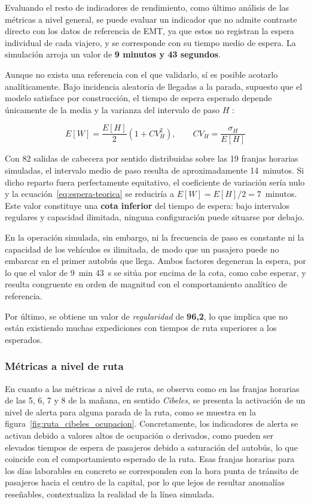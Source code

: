 Evaluando el resto de indicadores de rendimiento, como último análisis de las métricas a nivel general,
se puede evaluar un indicador
que no admite contraste directo con los datos de referencia de EMT, ya que
estos no registran la espera individual de cada viajero, y se corresponde con su tiempo medio de
espera. La simulación arroja un valor de \textbf{9 minutos y 43 segundos}.

Aunque no exista una referencia con el que validarlo, sí es posible
acotarlo analíticamente. Bajo incidencia aleatoria de llegadas a la parada,
supuesto que el modelo satisface por construcción, el tiempo de espera
esperado depende únicamente de la media y la varianza del intervalo de paso
$H$ \cite{welding1957instability, osuna1972control}:

\begin{equation}
E[W] = \frac{E[H]}{2}\left(1 + CV_H^{2}\right),
\qquad CV_H = \frac{\sigma_H}{E[H]}
\label{eq:espera-teorica}
\end{equation}

Con 82 salidas de cabecera por sentido distribuidas sobre las 19 franjas
horarias simuladas, el intervalo medio de paso resulta de aproximadamente
14~minutos. Si dicho reparto fuera perfectamente equitativo, el coeficiente de
variación sería nulo y la ecuación~\eqref{eq:espera-teorica} se reduciría a
$E[W] = E[H]/2 = 7$~minutos. Este valor constituye una \textbf{cota inferior}
del tiempo de espera: bajo intervalos regulares y capacidad ilimitada,
ninguna configuración puede situarse por debajo.

En la operación simulada, sin embargo, ni la frecuencia de paso es constante
ni la capacidad de los vehículos es ilimitada, de modo que un
pasajero puede no embarcar en el primer autobús que llega. Ambos factores
degeneran la espera, por lo que el
valor de 9~min 43~s se sitúa por encima de la cota, como cabe esperar, y
resulta congruente en orden de magnitud con el comportamiento analítico de
referencia.

Por último, se obtiene un valor de \textit{regularidad}
de \textbf{96,2}, lo que implica que no están existiendo muchas expediciones con tiempos de ruta superiores
a los esperados.

\subsubsection{Métricas a nivel de ruta}

En cuanto a las métricas a nivel de ruta, se observa como en las franjas horarias de las 5, 6, 7 y 8 de la mañana, en sentido
\textit{Cibeles}, se presenta la activación de un nivel de alerta para alguna parada de la ruta, como se muestra en la
figura~\ref{fig:ruta_cibeles_ocupacion}. Concretamente, los indicadores de alerta se activan debido a valores altos
de ocupación o derivados, como pueden ser elevados tiempos de espera de pasajeros debido a saturación del autobús, 
lo que coincide con el comportamiento esperado de la ruta. Esas franjas horarias para los días laborables
en concreto se corresponden
con la hora punta de tránsito de pasajeros hacia el centro de la capital, por lo que lejos de resultar anomalías reseñables,
contextualiza la realidad de la línea simulada.


